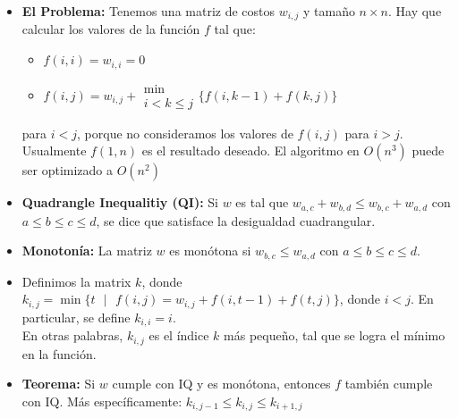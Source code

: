 \begin{itemize}
    \item{
		\textbf{El Problema:} Tenemos una matriz de costos $w_{i,j}$ y tama\~no $n\times n$. Hay que calcular 
		los valores de la funci\'on $f$ tal que:
		
		\begin{itemize}
			\item{ $ f(i,i) = w_{i, i} = 0 $ }
			\item{$ f(i, j) = w_{i,j} + \substack{\min \\ i < k \leq j}\{ f(i, k-1) + f(k, j)\} $}
		\end{itemize}
		
		para $i<j$, porque no consideramos los valores de $f(i,j)$ para $i>j$. \\
		Usualmente $f(1, n)$ es el resultado deseado. El algoritmo en $O(n^3)$ puede ser optimizado a $O(n^2)$
    }
    \item{
		\textbf{Quadrangle Inequalitiy (QI): } Si $w$ es tal que $w_{a,c} + w_{b,d} \leq w_{b,c} + w_{a,d}$ 
		con $a \leq b \leq c \leq d$, se dice que satisface la desigualdad cuadrangular.
    }
    \item{
		\textbf{Monoton\'ia:} La matriz $w$ es mon\'otona si $ w_{b,c} \leq w_{a,d} $ con $a \leq b \leq c \leq d$. 
    }
    \item{
		Definimos la matrix $k$, donde $k_{i,j} = \min\{ t\text{ }|\text{ }f(i,j) = w_{i,j} + f(i, t-1) + f(t, j)\}$, donde $i<j$.
		En particular, se define $k_{i, i} = i$. \\
		En otras palabras, $k_{i,j}$ es el \'indice $k$ m\'as peque\~no, tal que se logra el m\'inimo en la funci\'on.  
    }
    \item{
		\textbf{Teorema:} Si $w$ cumple con IQ y es mon\'otona, entonces $f$ tambi\'en cumple con IQ. M\'as espec\'ificamente:
		$ k_{i, j-1} \leq k_{i, j} \leq k_{i+1, j}$ 
    }
\end{itemize}
